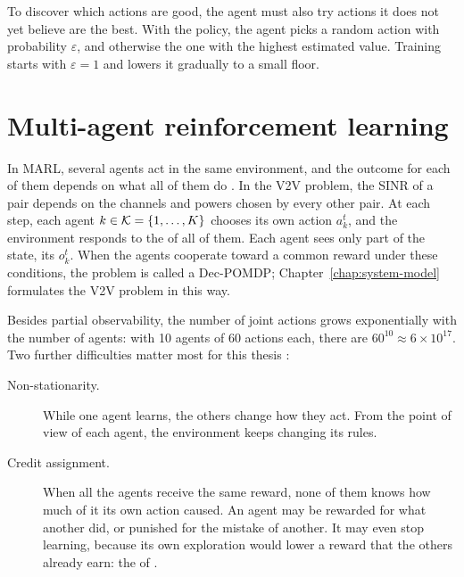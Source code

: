 To discover which actions are good, the agent must also try actions it does not yet believe are the best.
With the  policy, the agent picks a random action with
probability $\varepsilon$, and otherwise the one with the highest estimated value. Training starts with
$\varepsilon = 1$ and lowers it gradually to a small floor.

\section{Multi-agent reinforcement learning}
\label{sec:bg-marl}

In \ac{MARL}, several agents act in the same environment, and the outcome for each of them depends on what
all of them do \cite{gronauer+22marlsurvey}. In the \ac{V2V} problem, the \ac{SINR} of a pair
depends on the channels and powers chosen by every other pair. At each step, each agent
$k \in \mathcal{K} = \{1, \dots, K\}$ chooses its own action $a_k^t$, and the environment responds to the
 of all of them. Each agent sees only part of the state, its 
$o_k^t$. When the agents cooperate toward a common reward under these conditions, the problem is called a
\ac{Dec-POMDP}; Chapter~\ref{chap:system-model} formulates the \ac{V2V} problem in this way.

Besides partial observability, the number of joint actions grows exponentially with the number of agents:
with 10 agents of 60 actions each, there are $60^{10} \approx 6 \times 10^{17}$. Two further difficulties
matter most for this thesis \cite{gronauer+22marlsurvey}:
\begin{description}
  \item[Non-stationarity.] While one agent learns, the others change how they act. From the point of view
    of each agent, the environment keeps changing its rules.
  \item[Credit assignment.] When all the agents receive the same reward, none of them knows how much of it
    its own action caused. An agent may be rewarded for what another did, or punished for the mistake of
    another. It may even stop learning, because its own exploration would lower a reward that the others
    already earn: the  of \citet{sunehag+18vdn}.
\end{description}

